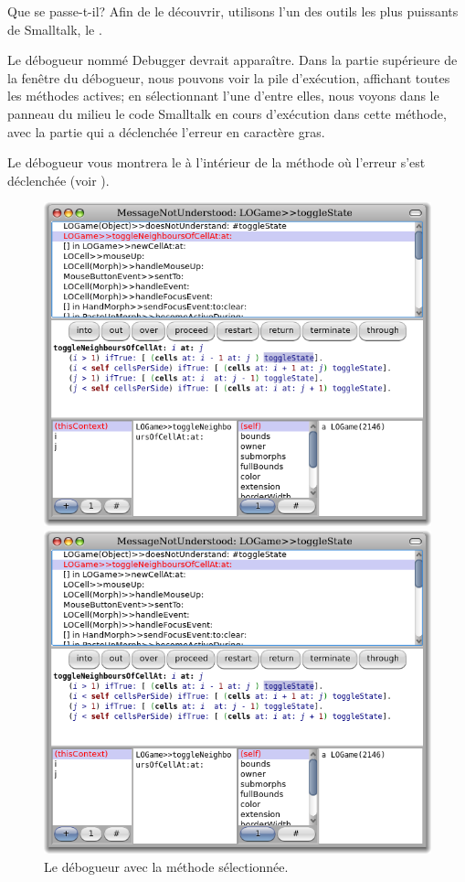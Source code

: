 \documentclass[a4paper,10pt,twoside]{book}
\begin{document}
\noindent
Que se passe-t-il? Afin de le découvrir, utilisons l'un des outils les plus puissants de Smalltalk, le .

Le débogueur nommé Debugger devrait apparaître.
Dans la partie supérieure de la fen\^etre du débogueur, nous pouvons
voir la pile d'exécution, affichant toutes les méthodes actives; en
sélectionnant l'une d'entre elles, nous voyons dans le panneau du
milieu le code Smalltalk en cours d'exécution dans cette méthode, avec
la partie qui a déclenchée l'erreur en caractère gras.

Le débogueur vous montrera le  à l'intérieur
de la méthode o\`u l'erreur s'est déclenchée (voir ).

\begin{figure}[ht]
\ifluluelse
	{\centerline {\includegraphics[width=\textwidth]{Debugger}}}
	{\centerline {\includegraphics[scale=0.7]{Debugger}}}
\caption{Le débogueur avec la méthode  sélectionnée.
}
\end{figure}
\end{document}
